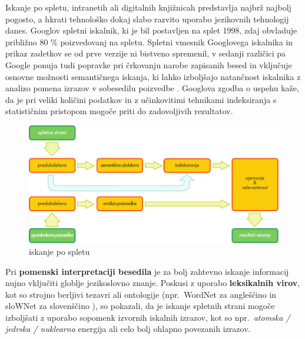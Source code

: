 \begin{multicols}{2}
Iskanje po spletu, intranetih ali digitalnih knjižnicah predstav\-lja najbrž naj\-bolj pogosto, a hkrati tehnološko dokaj slabo razvito uporabo jezikovnih tehnologij danes. Googlov spletni iskalnik, ki je bil postav\-ljen na splet 1998, zdaj obvladuje približno 80 \% poizvedovanj na spletu. Spletni vmesnik Googlovega iskalnika in prikaz zadetkov se od prve verzije ni bistveno spremenil, v sedanji različici pa Google ponuja tudi popravke pri črkovanju narobe zapisanih besed in vključuje osnovne možnosti semantičnega iskanja, ki lahko izboljšajo natančnost iskalnika z analizo po\-mena izrazov v sobesedilu poizvedbe \cite{pc1}.  Googlova zgodba o uspehu kaže, da je pri veliki količini podatkov in z učinkovitimi tehnikami indeksiranja s statističnim pristopom mogoče priti do zadovoljivih rezultatov.

\begin{figure}[htb]
  \center
  \includegraphics[width=\textwidth]{../_media/slovene/web_search_architecture}
  \caption{iskanje po spletu}
  \label{fig:websearcharch_de}
\end{figure}

Pri \textbf{pomenski interpretaciji besedila} je za bolj zah\-tevno iskanje informacij nujno vključiti glob\-lje jezikoslovno znanje. Poskusi z uporabo \textbf{leksikalnih virov}, kot so stroj\-no berljivi tezavri ali ontologije (npr.~WordNet za angleščino in sloWNet  za slovenščino \cite{slownet1}), so pokazali, da je iskanje spletnih strani mogoče izboljšati z uporabo sopo\-menk izvornih iskalnih izrazov, kot so npr.~\textit{atomska / jedrska / nuklearna} energija ali celo bolj ohlapno povezanih izrazov. 


\end{multicols}
